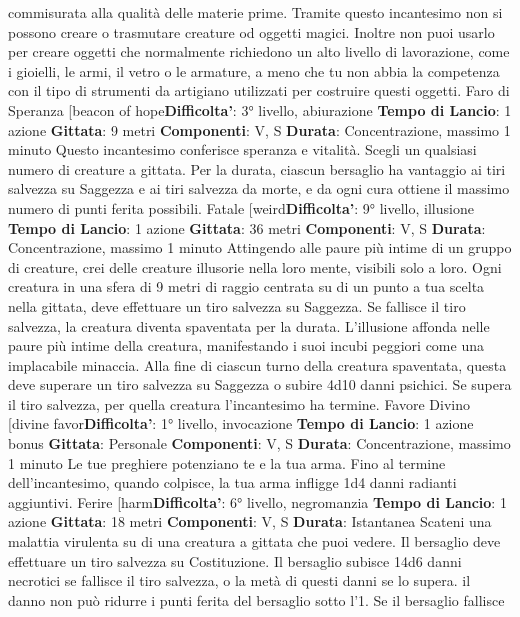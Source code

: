 \begin{multicols}{2}
commisurata alla qualità delle materie prime.
Tramite questo incantesimo non si possono creare o
trasmutare creature od oggetti magici. Inoltre non puoi
usarlo per creare oggetti che normalmente richiedono
un alto livello di lavorazione, come i gioielli, le armi, il
vetro o le armature, a meno che tu non abbia la
competenza con il tipo di strumenti da artigiano utilizzati
per costruire questi oggetti.
Faro di Speranza
[beacon of hope\textbf{Difficolta'}:
3° livello, abiurazione
\textbf{Tempo di Lancio}: 1 azione
\textbf{Gittata}: 9 metri
\textbf{Componenti}: V, S
\textbf{Durata}: Concentrazione, massimo 1 minuto
Questo incantesimo conferisce speranza e vitalità.
Scegli un qualsiasi numero di creature a gittata. Per la
durata, ciascun bersaglio ha vantaggio ai tiri salvezza
su Saggezza e ai tiri salvezza da morte, e da ogni cura
ottiene il massimo numero di punti ferita possibili.
Fatale
[weird\textbf{Difficolta'}:
9° livello, illusione
\textbf{Tempo di Lancio}: 1 azione
\textbf{Gittata}: 36 metri
\textbf{Componenti}: V, S
\textbf{Durata}: Concentrazione, massimo 1 minuto
Attingendo alle paure più intime di un gruppo di
creature, crei delle creature illusorie nella loro mente,
visibili solo a loro. Ogni creatura in una sfera di 9 metri
di raggio centrata su di un punto a tua scelta nella
gittata, deve effettuare un tiro salvezza su Saggezza.
Se fallisce il tiro salvezza, la creatura diventa
spaventata per la durata. L’illusione affonda nelle paure
più intime della creatura, manifestando i suoi incubi
peggiori come una implacabile minaccia. Alla fine di
ciascun turno della creatura spaventata, questa deve
superare un tiro salvezza su Saggezza o subire 4d10
danni psichici. Se supera il tiro salvezza, per quella
creatura l’incantesimo ha termine.
Favore Divino
[divine favor\textbf{Difficolta'}:
1° livello, invocazione
\textbf{Tempo di Lancio}: 1 azione bonus
\textbf{Gittata}: Personale
\textbf{Componenti}: V, S
\textbf{Durata}: Concentrazione, massimo 1 minuto
Le tue preghiere potenziano te e la tua arma. Fino al
termine dell’incantesimo, quando colpisce, la tua arma
infligge 1d4 danni radianti aggiuntivi.
Ferire
[harm\textbf{Difficolta'}:
6° livello, negromanzia
\textbf{Tempo di Lancio}: 1 azione
\textbf{Gittata}: 18 metri
\textbf{Componenti}: V, S
\textbf{Durata}: Istantanea
Scateni una malattia virulenta su di una creatura a
gittata che puoi vedere. Il bersaglio deve effettuare un
tiro salvezza su Costituzione. Il bersaglio subisce 14d6
danni necrotici se fallisce il tiro salvezza, o la metà di
questi danni se lo supera. il danno non può ridurre i
punti ferita del bersaglio sotto l’1. Se il bersaglio fallisce

\end{multicols}
